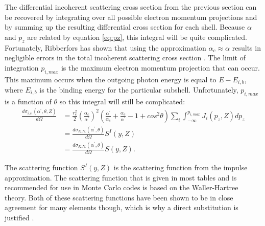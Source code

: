 The differential incoherent scattering cross section from the previous section
can be recovered by integrating over all possible electron momentum projections
and by summing up the resulting differential cross section for each shell.
Because $\alpha$ and $p_z$ are related by equation \ref{eq:pz}, this integral
will be quite complicated. Fortunately, Ribberfors has shown that using the
approximation $\alpha_c \approx \alpha$ results in negligible errors in the 
total incoherent scattering cross section \citep{ribberfors_x-ray_1983}. The
limit of integration $p_{i,max}$ is the maximum electron momentum projection
that can occur. This maximum occurs when the outgoing photon energy is equal to 
$E - E_{i,b}$, where $E_{i,b}$ is the binding energy for the particular subshell. 
Unfortunately, $p_{i,max}$ is a function of $\theta$ so this integral will 
still be complicated:
\begin{align}
  \frac{d\sigma_{i.s.}(\alpha^{'},\theta,Z)}{d\Omega} & = 
  \frac{r_e^2}{2} \left(\frac{\alpha_c}{\alpha^{'}}\right)^2 
  \left(\frac{\alpha^{'}}{\alpha_c} + \frac{\alpha_c}{\alpha^{'}} - 1 + 
  cos^2\theta \right) \sum_i \int_{-\infty}^{p_{i,max}} J_i(p_z,Z)dp_z \nonumber \\
  & = \frac{d\sigma_{K.N.}(\alpha^{'},\theta)}{d\Omega} S^I(y,Z) \nonumber \\
  & = \frac{d\sigma_{K.N.}(\alpha^{'},\theta)}{d\Omega} S(y,Z). \nonumber
\end{align}

The scattering function $S^I(y,Z)$ is the scattering function from the
impulse approximation. The scattering function that is given in most tables
and is recommended for use in Monte Carlo codes is based on the Waller-Hartree
theory. Both of these scattering functions have been shown to be in close 
agreement for many elements though, which is why a direct substitution is 
justified \citep{namito_implementation_1994}. 


